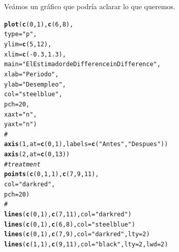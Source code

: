 \documentclass[onesided]{article}\usepackage[]{graphicx}\usepackage[]{color}
\makeatletter
\newcommand{\hlnum}[1]{\textcolor[rgb]{0.686,0.059,0.569}{#1}}%
\newcommand{\hlstr}[1]{\textcolor[rgb]{0.192,0.494,0.8}{#1}}%
\newcommand{\hlcom}[1]{\textcolor[rgb]{0.678,0.584,0.686}{\textit{#1}}}%
\newcommand{\hlopt}[1]{\textcolor[rgb]{0,0,0}{#1}}%
\newcommand{\hlstd}[1]{\textcolor[rgb]{0.345,0.345,0.345}{#1}}%
\newcommand{\hlkwc}[1]{\textcolor[rgb]{0.333,0.667,0.333}{#1}}%
\newcommand{\hlkwd}[1]{\textcolor[rgb]{0.737,0.353,0.396}{\textbf{#1}}}%
\newenvironment{kframe}{%
 \def\at@end@of@kframe{}%
 \ifinner\ifhmode%
  \def\at@end@of@kframe{\end{minipage}}%
  \begin{minipage}{\columnwidth}%
 \fi\fi%
 \def\FrameCommand##1{\hskip\@totalleftmargin \hskip-\fboxsep
 \colorbox{shadecolor}{##1}\hskip-\fboxsep
     \hskip-\linewidth \hskip-\@totalleftmargin \hskip\columnwidth}%
 \MakeFramed {\advance\hsize-\width
   \@totalleftmargin\z@ \linewidth\hsize
   \@setminipage}}%
 {\par\unskip\endMakeFramed%
 \at@end@of@kframe}
\newenvironment{knitrout}{}{} %
\makeatother
\begin{document}
Ve\'amos un gr\'afico que podr\'ia aclarar lo que queremos.

\begin{knitrout}
\color{fgcolor}\begin{kframe}
\begin{alltt}
\hlkwd{plot}\hlstd{(}\hlkwd{c}\hlstd{(}\hlnum{0}\hlstd{,} \hlnum{1}\hlstd{),} \hlkwd{c}\hlstd{(}\hlnum{6}\hlstd{,} \hlnum{8}\hlstd{),}
     \hlkwc{type} \hlstd{=} \hlstr{"p"}\hlstd{,}
     \hlkwc{ylim} \hlstd{=} \hlkwd{c}\hlstd{(}\hlnum{5}\hlstd{,} \hlnum{12}\hlstd{),}
     \hlkwc{xlim} \hlstd{=} \hlkwd{c}\hlstd{(}\hlopt{-}\hlnum{0.3}\hlstd{,} \hlnum{1.3}\hlstd{),}
     \hlkwc{main} \hlstd{=} \hlstr{"El Estimador de Difference in Difference"}\hlstd{,}
     \hlkwc{xlab} \hlstd{=} \hlstr{"Periodo"}\hlstd{,}
     \hlkwc{ylab} \hlstd{=} \hlstr{"Desempleo"}\hlstd{,}
     \hlkwc{col} \hlstd{=} \hlstr{"steelblue"}\hlstd{,}
     \hlkwc{pch} \hlstd{=} \hlnum{20}\hlstd{,}
     \hlkwc{xaxt} \hlstd{=} \hlstr{"n"}\hlstd{,}
     \hlkwc{yaxt} \hlstd{=} \hlstr{"n"}\hlstd{)}
\hlcom{#}
\hlkwd{axis}\hlstd{(}\hlnum{1}\hlstd{,} \hlkwc{at} \hlstd{=} \hlkwd{c}\hlstd{(}\hlnum{0}\hlstd{,} \hlnum{1}\hlstd{),} \hlkwc{labels} \hlstd{=} \hlkwd{c}\hlstd{(}\hlstr{"Antes"}\hlstd{,} \hlstr{"Despues"}\hlstd{))}
\hlkwd{axis}\hlstd{(}\hlnum{2}\hlstd{,} \hlkwc{at} \hlstd{=} \hlkwd{c}\hlstd{(}\hlnum{0}\hlstd{,} \hlnum{13}\hlstd{))}
\hlcom{# treatment}
\hlkwd{points}\hlstd{(}\hlkwd{c}\hlstd{(}\hlnum{0}\hlstd{,} \hlnum{1}\hlstd{,} \hlnum{1}\hlstd{),} \hlkwd{c}\hlstd{(}\hlnum{7}\hlstd{,} \hlnum{9}\hlstd{,} \hlnum{11}\hlstd{),}
       \hlkwc{col} \hlstd{=} \hlstr{"darkred"}\hlstd{,}
       \hlkwc{pch} \hlstd{=} \hlnum{20}\hlstd{)}
\hlcom{# }
\hlkwd{lines}\hlstd{(}\hlkwd{c}\hlstd{(}\hlnum{0}\hlstd{,} \hlnum{1}\hlstd{),} \hlkwd{c}\hlstd{(}\hlnum{7}\hlstd{,} \hlnum{11}\hlstd{),} \hlkwc{col} \hlstd{=} \hlstr{"darkred"}\hlstd{)}
\hlkwd{lines}\hlstd{(}\hlkwd{c}\hlstd{(}\hlnum{0}\hlstd{,} \hlnum{1}\hlstd{),} \hlkwd{c}\hlstd{(}\hlnum{6}\hlstd{,} \hlnum{8}\hlstd{),} \hlkwc{col} \hlstd{=} \hlstr{"steelblue"}\hlstd{)}
\hlkwd{lines}\hlstd{(}\hlkwd{c}\hlstd{(}\hlnum{0}\hlstd{,} \hlnum{1}\hlstd{),} \hlkwd{c}\hlstd{(}\hlnum{7}\hlstd{,} \hlnum{9}\hlstd{),} \hlkwc{col} \hlstd{=} \hlstr{"darkred"}\hlstd{,} \hlkwc{lty} \hlstd{=} \hlnum{2}\hlstd{)}
\hlkwd{lines}\hlstd{(}\hlkwd{c}\hlstd{(}\hlnum{1}\hlstd{,} \hlnum{1}\hlstd{),} \hlkwd{c}\hlstd{(}\hlnum{9}\hlstd{,} \hlnum{11}\hlstd{),} \hlkwc{col} \hlstd{=} \hlstr{"black"}\hlstd{,} \hlkwc{lty} \hlstd{=} \hlnum{2}\hlstd{,} \hlkwc{lwd} \hlstd{=} \hlnum{2}\hlstd{)}

\end{alltt}
\end{kframe}
\end{knitrout}
\end{document}
